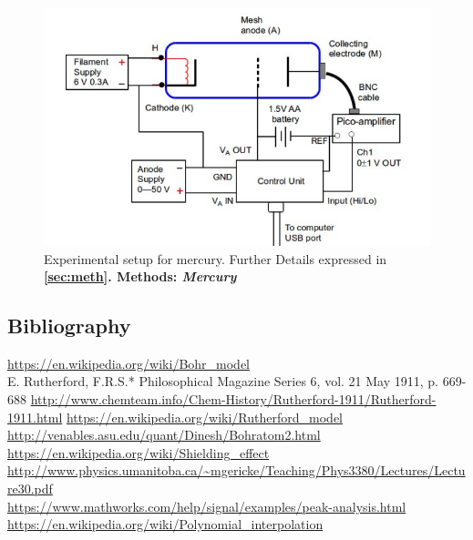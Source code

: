 \documentclass[%
 reprint,
 amsmath,amssymb,
 aps,
]{revtex4-1}
\begin{document}
\begin{figure}[!hb]\centering
\includegraphics[width = \textwidth,keepaspectratio]{mercuryb.png}
\caption{Experimental setup for mercury. Further Details expressed in \textbf{\ref{sec:meth}. Methods: \textit{Mercury} }}
\label{fig:merb}
\end{figure}


\begin{thebibliography}{50}
\section{\label{sec:level5}Bibliography}
 \url{https://en.wikipedia.org/wiki/Bohr_model}\\
 E. Rutherford, F.R.S.*
Philosophical Magazine
Series 6, vol. 21
May 1911, p. 669-688
\url{http://www.chemteam.info/Chem-History/Rutherford-1911/Rutherford-1911.html}
 \url{https://en.wikipedia.org/wiki/Rutherford_model}\\%
 \url{http://venables.asu.edu/quant/Dinesh/Bohratom2.html}\\
 \url{https://en.wikipedia.org/wiki/Shielding_effect}\\
 \url{http://www.physics.umanitoba.ca/~mgericke/Teaching/Phys3380/Lectures/Lecture30.pdf}\\
 \url{https://www.mathworks.com/help/signal/examples/peak-analysis.html}
 \url{https://en.wikipedia.org/wiki/Polynomial_interpolation}
\end{thebibliography}
\end{document}
